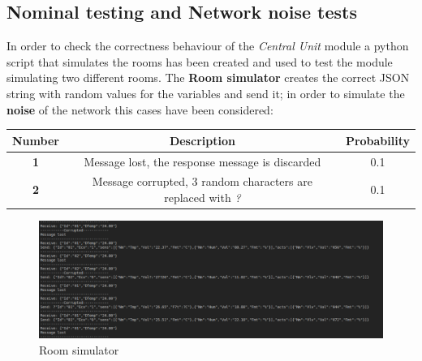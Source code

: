 \subsection{Nominal testing and Network noise tests}
In order to check the correctness behaviour of the \textit{Central Unit} module a python script that simulates the rooms has been created and used to test the module simulating two different rooms.
The \textbf{Room simulator} creates the correct JSON string with random values for the variables and send it; in order to simulate the \textbf{noise} of the network this cases have been considered:
\begin{center}
	\begin{tabular}{||c | c | c ||} 
		\hline
		Number			& 	Description & Probability\\ 
		\hline
		\textbf{1}		&	Message lost, the response message is discarded & 0.1 \\ 
		\hline
		\textbf{2}		&	Message corrupted, 3 random characters are replaced with \textit{?} & 0.1\\ 
		\hline
	\end{tabular}
\end{center}
\begin{figure}[H]
	\centering
	\includegraphics[width=12cm,keepaspectratio]{img/room_simulator}
	\caption{Room simulator}
	\label{fig:roomsimulator}
\end{figure}